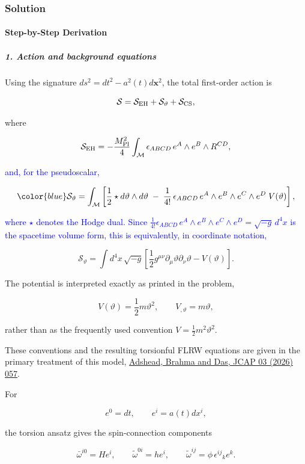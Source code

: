 \subsubsection*{Solution}
\paragraph*{Step-by-Step Derivation}

\subparagraph*{1. Action and background equations}

Using the signature $ds^2=dt^2-a^2(t)d\mathbf{x}^2$, the total first-order action is

\[
\mathcal S = \mathcal S_{\rm EH} + \mathcal S_{\vartheta} + \mathcal S_{\rm CS},
\]

where

\[
\mathcal S_{\rm EH} = -\frac{M_{\rm Pl}^2}{4} \int_{\mathcal M} \epsilon_{ABCD}\, e^A\wedge e^B\wedge R^{CD},
\]

\textcolor{blue}{and, for the pseudoscalar,}

\[
{\color{blue}
\mathcal S_{\vartheta} = \int_{\mathcal M} \left[ \frac12 \star d\vartheta\wedge d\vartheta \;-\; \frac{1}{4!}\,\epsilon_{ABCD}\, e^A\wedge e^B\wedge e^C\wedge e^D\; V(\vartheta) \right],}
\]

\textcolor{blue}{where $\star$ denotes the Hodge dual. Since $\tfrac{1}{4!}\epsilon_{ABCD}\,e^A\wedge e^B\wedge e^C\wedge e^D=\sqrt{-g}\,d^4x$ is the spacetime volume form, this is equivalently, in coordinate notation,}

\[
\mathcal S_{\vartheta} = \int d^4x\,\sqrt{-g} \left[ \frac12 g^{\mu\nu}\partial_\mu\vartheta\partial_\nu\vartheta -V(\vartheta) \right].
\]

The potential is interpreted exactly as printed in the problem,

\[
V(\vartheta)=\frac12m\vartheta^2,\qquad V_{,\vartheta}=m\vartheta,
\]

rather than as the frequently used convention $V=\frac12m^2\vartheta^2$.

These conventions and the resulting torsionful FLRW equations are given in the primary treatment of this model, \href{\detokenize{https://inspirehep.net/files/eb3973db1bbed05a53c1b06c37b78a17}}{Adshead, Brahma and Das, JCAP 03 (2026) 057}.

For

\[
e^0=dt,\qquad e^i=a(t)dx^i,
\]

the torsion ansatz gives the spin-connection components

\[
\bar\omega^{i0}=H e^i,\qquad \widetilde\omega^{0i}=h e^i,\qquad \widetilde\omega^{ij}=\phi\,\epsilon^{ij}{}_k e^k.
\]


